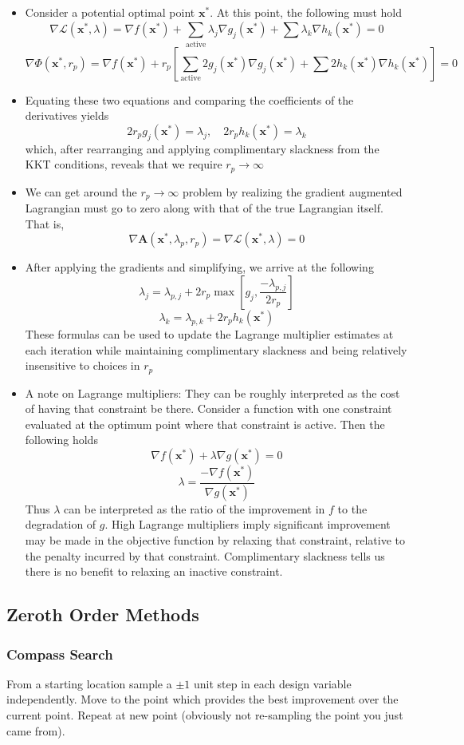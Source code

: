 \documentclass[11pt]{article}
\newcommand{\sumlim}[2]{\sum\limits_{#1}^{#2}}
\newcommand{\boldx}{\mathbf{x}}
\newcommand{\xstar}{\boldx^*}
\begin{document}
\begin{itemize}
\item Consider a potential optimal point $\xstar$. At this point, the following must hold
$$\nabla\mathcal{L}(\xstar,\lambda) = \nabla f(\xstar) + \sumlim{\textrm{active}}{}\lambda_j\nabla g_j(\xstar) + \sum\lambda_k\nabla h_k(\xstar) = 0$$
$$\nabla\Phi(\xstar,r_p) = \nabla f(\xstar) + r_p\left[\sumlim{\textrm{active}}{}2g_j(\xstar)\nabla g_j(\xstar) + \sum2h_k(\xstar)\nabla h_k(\xstar)\right] = 0$$
\item Equating these two equations and comparing the coefficients of the derivatives yields
$$2r_pg_j(\xstar)=\lambda_j,\quad 2r_ph_k(\xstar)=\lambda_k$$
which, after rearranging and applying complimentary slackness from the KKT conditions, reveals that we require $r_p\to\infty$
\item We can get around the $r_p\to\infty$ problem by realizing the gradient augmented Lagrangian must go to zero along with that of the true Lagrangian itself. That is,
$$\nabla\mathbf{A}(\xstar,\lambda_p,r_p)=\nabla\mathcal{L}(\xstar,\lambda)=0$$
\item After applying the gradients and simplifying, we arrive at the following
$$\lambda_j=\lambda_{p,j}+2r_p\max\left[g_j,\frac{-\lambda_{p,j}}{2r_p}\right]$$
$$\lambda_k=\lambda_{p,k}+2r_ph_k(\xstar)$$
These formulas can be used to update the Lagrange multiplier estimates at each iteration while maintaining complimentary slackness and being relatively insensitive to choices in $r_p$
\item A note on Lagrange multipliers: They can be roughly interpreted as the cost of having that constraint be there. Consider a function with one constraint evaluated at the optimum point where that constraint is active. Then the following holds
$$\nabla f(\xstar)+\lambda\nabla g(\xstar)=0$$
$$\lambda=\frac{-\nabla f(\xstar)}{\nabla g(\xstar)}$$
Thus $\lambda$ can be interpreted as the ratio of the improvement in $f$ to the degradation of $g$. High Lagrange multipliers imply significant improvement may be made in the objective function by relaxing that constraint, relative to the penalty incurred by that constraint. Complimentary slackness tells us there is no benefit to relaxing an inactive constraint.
\end{itemize}

\subsection{Zeroth Order Methods}
\subsubsection{Compass Search}
From a starting location sample a $\pm1$ unit step in each design variable independently. Move to the point which provides the best improvement over the current point. Repeat at new point (obviously not re-sampling the point you just came from).
\end{document}

